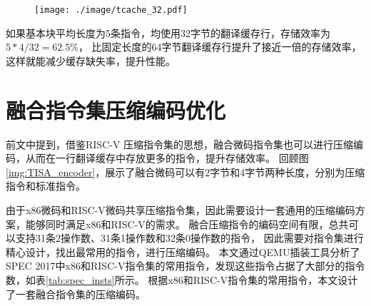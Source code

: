 \begin{figure}[!htbp]
    \centering
    \texttt{[image: ./image/tcache\_32.pdf]}
    \label{img:tcache_32}
  \end{figure}

如果基本块平均长度为5条指令，均使用32字节的翻译缓存行，存储效率为$ 5*4 / 32 = 62.5\% $，
比固定长度的64字节翻译缓存行提升了接近一倍的存储效率，这样就能减少缓存缺失率，提升性能。

\section{融合指令集压缩编码优化}

前文中提到，借鉴RISC-V 压缩指令集的思想，融合微码指令集也可以进行压缩编码，从而在一行翻译缓存中存放更多的指令，提升存储效率。
回顾图\ref{img:TISA_encoder}，展示了融合微码可以有2字节和4字节两种长度，分别为压缩指令和标准指令。

由于x86微码和RISC-V微码共享压缩指令集，因此需要设计一套通用的压缩编码方案，能够同时满足x86和RISC-V的需求。
融合压缩指令的编码空间有限，总共可以支持31条2操作数、31条1操作数和32条0操作数的指令，
因此需要对指令集进行精心设计，找出最常用的指令，进行压缩编码。
本文通过QEMU插装工具分析了SPEC 2017中x86和RISC-V指令集的常用指令，发现这些指令占据了大部分的指令数，如表\ref{tab:spec_insts}所示。
根据x86和RISC-V指令集的常用指令，本文设计了一套融合指令集的压缩编码。


